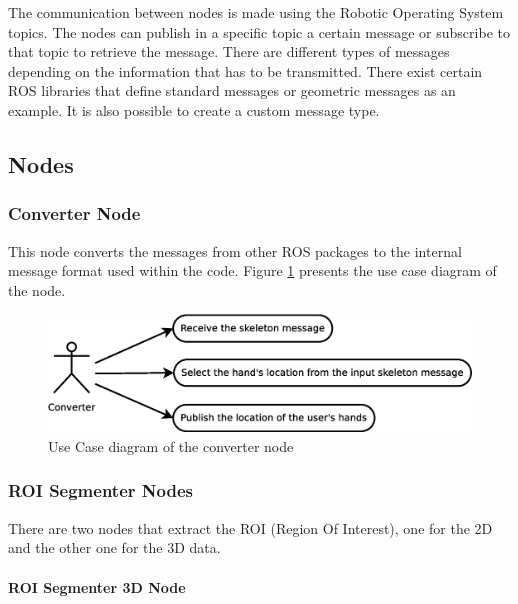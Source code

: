 The communication between nodes is made using the Robotic Operating System topics. The nodes can publish in a specific topic a certain message or subscribe to that topic to retrieve the message. 
There are different types of messages depending on the information that has to be transmitted. There exist certain ROS libraries that define standard messages or geometric messages as an example. It is also possible to create a custom message type. 


\subsection{Nodes}

\subsubsection{Converter Node}

This node converts the messages from other ROS packages to the internal message format used within the code. 
Figure \ref{uc_converter} presents the use case diagram of the node. 

\begin{figure}[H]
\begin{center}
	\includegraphics[scale=0.4]{img/diagrams/uc_converter.eps}
			\caption[Use case diagram converter node]{Use Case diagram of the converter node}
		\label{uc_converter}
\end{center}
\end{figure}
	
\subsubsection{ROI Segmenter Nodes}
There are two nodes that extract the ROI (Region Of Interest), one for the 2D and the other one for the 3D data.

\paragraph {ROI Segmenter 3D Node\\[0.5cm]}

